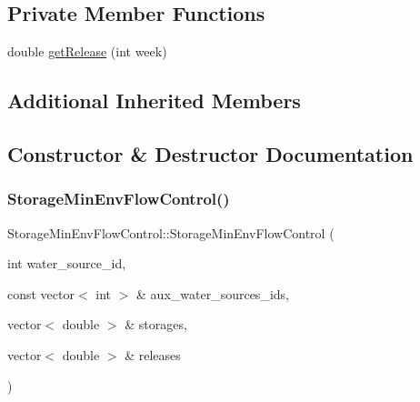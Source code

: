 \subsection*{Private Member Functions}
\begin{DoxyCompactItemize}
\item 
double \mbox{\hyperlink{classStorageMinEnvFlowControl_ae78055a8be7ad9e119384958ef88e174_ae78055a8be7ad9e119384958ef88e174}{get\+Release}} (int week)
\end{DoxyCompactItemize}
\subsection*{Additional Inherited Members}


\subsection{Constructor \& Destructor Documentation}
\mbox{\label{classStorageMinEnvFlowControl_aba965c28890bf5abb1230dd6d8879f18_aba965c28890bf5abb1230dd6d8879f18}} 
\subsubsection{\texorpdfstring{Storage\+Min\+Env\+Flow\+Control()}{StorageMinEnvFlowControl()}\hspace{0.1cm}{\footnotesize\ttfamily [1/2]}}
{\footnotesize\ttfamily Storage\+Min\+Env\+Flow\+Control\+::\+Storage\+Min\+Env\+Flow\+Control (\begin{DoxyParamCaption}\item[{int}]{water\+\_\+source\+\_\+id,  }\item[{const vector$<$ int $>$ \&}]{aux\+\_\+water\+\_\+sources\+\_\+ids,  }\item[{vector$<$ double $>$ \&}]{storages,  }\item[{vector$<$ double $>$ \&}]{releases }\end{DoxyParamCaption})}

\mbox{\label{classStorageMinEnvFlowControl_a2279f6d44b8ba69830a29654ddee8d3a_a2279f6d44b8ba69830a29654ddee8d3a}} 
